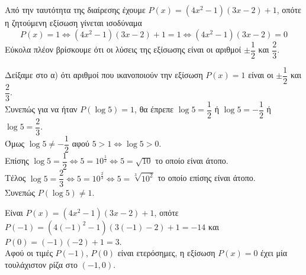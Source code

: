 \begin{alist}
\item Από την ταυτότητα της διαίρεσης έχουμε $P(x) = (4x^2 - 1)(3x - 2) + 1$, οπότε η ζητούμενη εξίσωση γίνεται ισοδύναμα
\[P(x) = 1 \Leftrightarrow (4x^2 - 1)(3x - 2) + 1 = 1 \Leftrightarrow (4x^2 - 1)(3x - 2) = 0\]
Εύκολα πλέον βρίσκουμε ότι οι λύσεις της εξίσωσης είναι οι αριθμοί $\pm\dfrac{1}{2}$ και $\dfrac{2}{3}$.
\item Δείξαμε στο α) ότι αριθμοί που ικανοποιούν την εξίσωση $P(x) = 1$ είναι οι $\pm\dfrac{1}{2}$ και $\dfrac{2}{3}$. \\
Συνεπώς για να ήταν $P(\log 5) = 1$, θα έπρεπε $\log 5 = \dfrac{1}{2}$ ή $\log 5 = -\dfrac{1}{2}$ ή $\log 5 = \dfrac{2}{3}$. \\
Όμως $\log 5 \neq -\dfrac{1}{2}$ αφού $5 > 1 \Leftrightarrow \log 5 > 0$. \\
Επίσης $\log 5 = \dfrac{1}{2} \Leftrightarrow 5 = 10^{\frac{1}{2}} \Leftrightarrow 5 = \sqrt{10}$ το οποίο είναι άτοπο. \\
Τέλος $\log 5 = \dfrac{2}{3} \Leftrightarrow 5 = 10^{\frac{2}{3}} \Leftrightarrow 5 = \sqrt[3]{10^2}$ το οποίο επίσης είναι άτοπο. \\
Συνεπώς $P(\log 5) \neq 1$.
\item Είναι $P(x) = (4x^2 - 1)(3x - 2) + 1$, οπότε $P(-1) = (4(-1)^2 - 1)(3(-1) - 2) + 1 = -14$ και $P(0) = (-1)(-2) + 1 = 3$. \\
Αφού οι τιμές $P(-1)$, $P(0)$ είναι ετερόσημες, η εξίσωση $P(x) = 0$ έχει μία τουλάχιστον ρίζα στο $(-1, 0)$.
\end{alist}

